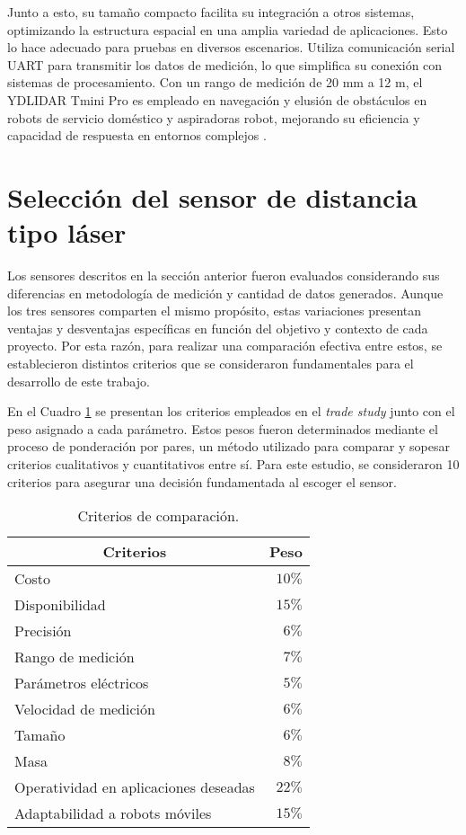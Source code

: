 Junto a esto, su tamaño compacto facilita su integración a otros sistemas, optimizando la estructura espacial en una amplia variedad de aplicaciones. Esto lo hace adecuado para pruebas en diversos escenarios. Utiliza comunicación serial UART para transmitir los datos de medición, lo que simplifica su conexión con sistemas de procesamiento. Con un rango de medición de 20 mm a 12 m, el YDLIDAR Tmini Pro es empleado en navegación y elusión de obstáculos en robots de servicio doméstico y aspiradoras robot, mejorando su eficiencia y capacidad de respuesta en entornos complejos \cite{eai_technology_ydlidar_2022}.

\section{Selección del sensor de distancia tipo láser}
Los sensores descritos en la sección anterior fueron evaluados considerando sus diferencias en metodología de medición y cantidad de datos generados. Aunque los tres sensores comparten el mismo propósito, estas variaciones presentan ventajas y desventajas específicas en función del objetivo y contexto de cada proyecto. Por esta razón, para realizar una comparación efectiva entre estos, se establecieron distintos criterios que se consideraron fundamentales para el desarrollo de este trabajo.

En el Cuadro \ref{cuadro:criterios} se presentan los criterios empleados en el \textit{trade study} junto con el peso asignado a cada parámetro. Estos pesos fueron determinados mediante el proceso de ponderación por pares, un método utilizado para comparar y sopesar criterios cualitativos y cuantitativos entre sí. Para este estudio, se consideraron 10 criterios para asegurar una decisión fundamentada al escoger el sensor.

\begin{table}[H]
	\centering
	\begin{tabular}{|l|r|}
		\hline
		\multicolumn{1}{|c|}{\textbf{Criterios}}&\multicolumn{1}{|c|}{\textbf{Peso}}\\ 
		\hline
		Costo&$10\%$\\
		\hline
		Disponibilidad&$15\%$\\
		\hline
		Precisión&$6\%$\\
		\hline
		Rango de medición&$7\%$\\
		\hline
		Parámetros eléctricos&$5\%$\\
		\hline
		Velocidad de medición&$6\%$\\
		\hline
		Tamaño&$6\%$\\
		\hline
		Masa&$8\%$\\
		\hline
		Operatividad en aplicaciones deseadas&$22\%$\\
		\hline
		Adaptabilidad a robots móviles&$15\%$\\
		\hline
	\end{tabular}
	\caption{Criterios de comparación.} 
	\label{cuadro:criterios}
\end{table}

